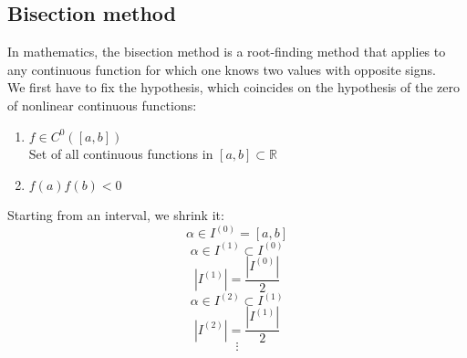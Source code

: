 \subsection{Bisection method}
In mathematics, the bisection method is a root-finding method that applies to any continuous function for which one knows two values with opposite signs.\\
We first have to fix the hypothesis, which coincides on the hypothesis of the zero of nonlinear continuous functions:
\begin{enumerate}
    \item $f\in C^0([a,b])$\\
    Set of all continuous functions in $[a,b]\subset\mathbb{R}$
    \item $f(a)f(b)<0$\\
    \begin{figure}[!ht]
        \centering
        \qquad
        \captionsetup{justification=centering}
    \end{figure}
\end{enumerate}

Starting from an interval, we shrink it:
$$
\alpha\in I^{(0)}=[a,b]$$
$$
\alpha\in I^{(1)}\subset I^{(0)}$$
$$
|I^{(1)}|=\frac{|I^{(0)}|}{2}$$
$$
\alpha\in I^{(2)}\subset I^{(1)}$$
$$
|I^{(2)}|=\frac{|I^{(1)}|}{2}$$
$$
\vdots
$$

